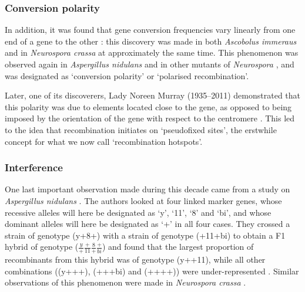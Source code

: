 \subsubsection{Conversion polarity}

In addition, it was found that gene conversion frequencies vary linearly from one end of a gene to the other \citep[reviewed in][]{nicolas1994polarity}: this discovery was made in both \textit{Ascobolus immeraus} \citep{lissouba1960existence,lissouba1962fine} and in \textit{Neurospora crassa} \citep{murray1960complementation} at approximately the same time. 
This phenomenon was observed again in \textit{Aspergillus nidulans} \citep{siddiqi1962mutagenic} and in other mutants of \textit{Neurospora} \citep{stadler1963recombination}, and was designated as ‘conversion polarity’ or ‘polarised recombination’.

Later, one of its discoverers, Lady Noreen Murray (1935--2011) demonstrated that this polarity was due to elements located close to the gene, as opposed to being imposed by the orientation of the gene with respect to the centromere \citep{murray1968polarized}. This led to the idea that recombination initiates on ‘pseudofixed sites’, the erstwhile concept for what we now call ‘recombination hotspots’.





\subsubsection{Interference}

One last important observation made during this decade came from a study on \textit{Aspergillus nidulans} \citep{pritchard1955linear}.
The authors looked at four linked marker genes, whose recessive alleles will here be designated as ‘y’, ‘11’, ‘8’ and ‘bi’, and whose dominant alleles will here be designated as ‘+’ in all four cases. 
They crossed a strain of genotype (y+8+) with a strain of genotype (+11+bi) to obtain a F1 hybrid of genotype ($\frac{y}{+}\frac{+}{11}\frac{8}{+}\frac{+}{bi}$) and found that the largest proportion of recombinants from this hybrid was of genotype (y++11), while all other combinations ((y+++), (+++bi) and (++++)) were under-represented \citep[reviewed in][]{whitehouse1965crossing}.
Similar observations of this phenomenon were made in \textit{Neurospora crassa} \citep{mitchell1956consideration}.

